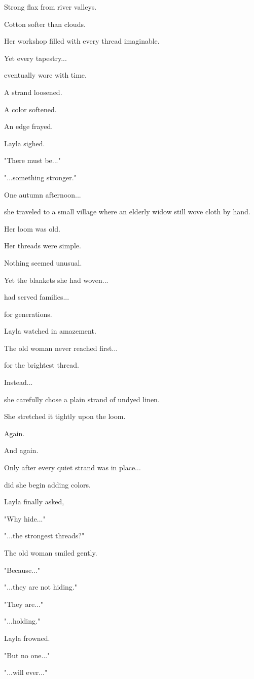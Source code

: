 \documentclass[12pt,openany]{book}
\begin{document}
Strong flax from river valleys.

Cotton softer than clouds.

Her workshop filled with every thread imaginable.

Yet every tapestry...

eventually wore with time.

A strand loosened.

A color softened.

An edge frayed.

Layla sighed.

"There must be..."

"...something stronger."

One autumn afternoon...

she traveled to a small village where an elderly widow still wove cloth by hand.

Her loom was old.

Her threads were simple.

Nothing seemed unusual.

Yet the blankets she had woven...

had served families...

for generations.

Layla watched in amazement.

The old woman never reached first...

for the brightest thread.

Instead...

she carefully chose a plain strand of undyed linen.

She stretched it tightly upon the loom.

Again.

And again.

Only after every quiet strand was in place...

did she begin adding colors.

Layla finally asked,

"Why hide..."

"...the strongest threads?"

The old woman smiled gently.

"Because..."

"...they are not hiding."

"They are..."

"...holding."

Layla frowned.

"But no one..."

"...will ever..."
\end{document}
